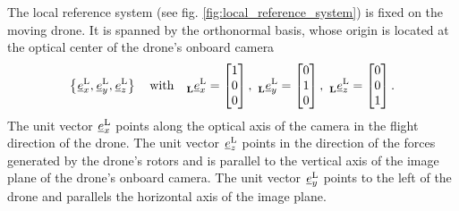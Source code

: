 The local reference system (see fig. \ref{fig:local_reference_system}) is fixed on the moving drone.
It is spanned by the orthonormal basis,
whose origin is located at the optical center of the drone's onboard camera
\begin{equation}
    \left\{
        \unitvec[]{\text L}{x}{}{},
        \unitvec[]{\text L}{y}{}{},
        \unitvec[]{\text L}{z}{}{}
    \right\}
    \quad \text{with} \quad 
    \unitvec[]{\text L}{x}{\lrs}{} = \begin{bmatrix} 1 \\ 0 \\ 0 \end{bmatrix},\ 
    \unitvec[]{\text L}{y}{\lrs}{} = \begin{bmatrix} 0 \\ 1 \\ 0 \end{bmatrix},\ 
    \unitvec[]{\text L}{z}{\lrs}{} = \begin{bmatrix} 0 \\ 0 \\ 1 \end{bmatrix}.
\end{equation}
The unit vector 
$\unitvec[]{\text L}{x}{}{}$ 
points along the optical axis of the camera
in the flight direction of the drone.
The unit vector
$\unitvec[]{\text L}{z}{}{}$ 
points in the direction of the forces generated by the drone's rotors
and is parallel to the vertical axis of the image plane of the drone's onboard camera.
The unit vector 
$\unitvec[]{\text L}{y}{}{}$ 
points to the left of the drone
and parallels the horizontal axis of the image plane.






